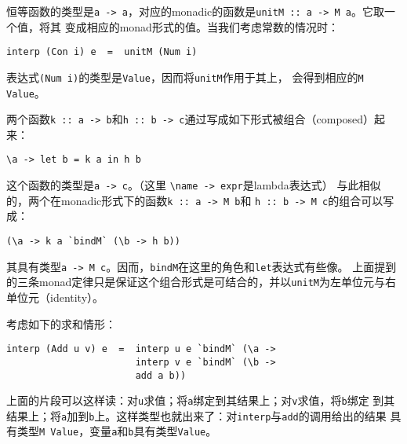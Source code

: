 \documentclass[12pt]{article}
\begin{document}
\indent{}恒等函数的类型是\texttt{a -> a}，对应的monadic的函数是\texttt{unitM :: a -> M a}。它取一个值，将其
变成相应的monad形式的值。当我们考虑常数的情况时：
\begin{verbatim}
interp (Con i) e  =  unitM (Num i)
\end{verbatim}
\noindent{}表达式\texttt{(Num i)}的类型是\texttt{Value}，因而将\texttt{unitM}作用于其上，
会得到相应的\texttt{M Value}。

\indent{}两个函数\texttt{k :: a -> b}和\texttt{h :: b -> c}通过写成如下形式被组合（composed）起来：
\begin{verbatim}
\a -> let b = k a in h b
\end{verbatim}
\noindent{}这个函数的类型是\texttt{a -> c}。（这里 \texttt{\textbackslash{}name -> expr}是lambda表达式）
与此相似的，两个在monadic形式下的函数\texttt{k :: a -> M b}和 \texttt{h :: b -> M c}的组合可以写成：
\begin{verbatim}
(\a -> k a `bindM` (\b -> h b))
\end{verbatim}
\noindent{}其具有类型\texttt{a -> M c}。因而，\texttt{bindM}在这里的角色和\texttt{let}表达式有些像。
上面提到的三条monad定律只是保证这个组合形式是可结合的，并以\texttt{unitM}为左单位元与右单位元（identity）。

\indent{}考虑如下的求和情形：
\begin{verbatim}
interp (Add u v) e  =  interp u e `bindM` (\a ->
                       interp v e `bindM` (\b ->
                       add a b))
\end{verbatim}
\indent{}上面的片段可以这样读：对\texttt{u}求值；将\texttt{a}绑定到其结果上；对\texttt{v}求值，将\texttt{b}绑定
到其结果上；将\texttt{a}加到\texttt{b}上。这样类型也就出来了：对\texttt{interp}与\texttt{add}的调用给出的结果
具有类型\texttt{M Value}，变量\texttt{a}和\texttt{b}具有类型\texttt{Value}。
\end{document}
